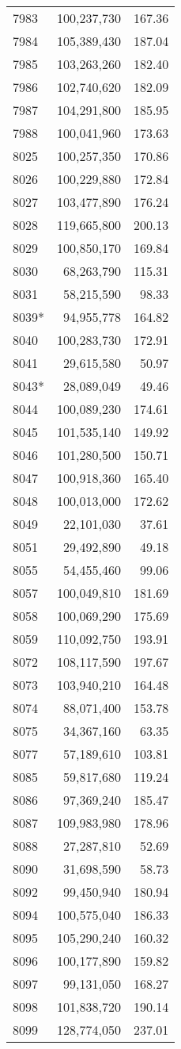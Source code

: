 \documentclass[11pt]{article}
\begin{document}
\begin{longtable}[!hbtp]{l r r}
7983	&	100,237,730	&	167.36	\\
7984	&	105,389,430	&	187.04	\\
7985	&	103,263,260	&	182.40	\\
7986	&	102,740,620	&	182.09	\\
7987	&	104,291,800	&	185.95	\\
7988	&	100,041,960	&	173.63	\\
8025	&	100,257,350	&	170.86	\\
8026	&	100,229,880	&	172.84	\\
8027	&	103,477,890	&	176.24	\\
8028	&	119,665,800	&	200.13	\\
8029	&	100,850,170	&	169.84	\\
8030	&	68,263,790	&	115.31	\\
8031	&	58,215,590	&	98.33	\\
8039*	&	94,955,778	&	164.82	\\
8040	&	100,283,730	&	172.91	\\
8041	&	29,615,580	&	50.97	\\
8043*	&	28,089,049	&	49.46	\\
8044	&	100,089,230	&	174.61	\\
8045	&	101,535,140	&	149.92	\\
8046	&	101,280,500	&	150.71	\\
8047	&	100,918,360	&	165.40	\\
8048	&	100,013,000	&	172.62	\\
8049	&	22,101,030	&	37.61	\\
8051	&	29,492,890	&	49.18	\\
8055	&	54,455,460	&	99.06	\\
8057	&	100,049,810	&	181.69	\\
8058	&	100,069,290	&	175.69	\\
8059	&	110,092,750	&	193.91	\\
8072	&	108,117,590	&	197.67	\\
8073	&	103,940,210	&	164.48	\\
8074	&	88,071,400	&	153.78	\\
8075	&	34,367,160	&	63.35	\\
8077	&	57,189,610	&	103.81	\\
8085	&	59,817,680	&	119.24	\\
8086	&	97,369,240	&	185.47	\\
8087	&	109,983,980	&	178.96	\\
8088	&	27,287,810	&	52.69	\\
8090	&	31,698,590	&	58.73	\\
8092	&	99,450,940	&	180.94	\\
8094	&	100,575,040	&	186.33	\\
8095	&	105,290,240	&	160.32	\\
8096	&	100,177,890	&	159.82	\\
8097	&	99,131,050	&	168.27	\\
8098	&	101,838,720	&	190.14	\\
8099	&	128,774,050	&	237.01	\\


\end{longtable}
\end{document}
